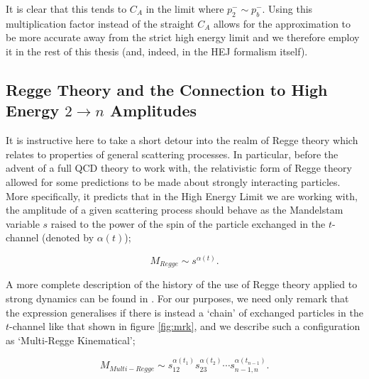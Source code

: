 It is clear that this tends to $C_A$ in the limit where $p_2^- \sim p_b^-$. Using this multiplication factor instead of the straight $C_A$ allows for the approximation to be more accurate away from the strict high energy limit and we therefore employ it in the rest of this thesis (and, indeed, in the HEJ formalism itself). 

\subsection{Regge Theory and the Connection to High Energy $2 \to n$ Amplitudes} 

It is instructive here to take a short detour into the realm of Regge theory which relates to properties of general scattering processes. In particular, before the advent of a full QCD theory to work with, the relativistic form of Regge theory allowed for some predictions to be made about strongly interacting particles. More specifically, it predicts that in the High Energy Limit we are working with, the amplitude of a given scattering process should behave as the Mandelstam variable $s$ raised to the power of the spin of the particle exchanged in the $t$-channel (denoted by $\alpha(t)$);

\begin{equation}
M_{Regge} \sim s^{\alpha(t)}.
\end{equation}

A more complete description of the history of the use of Regge theory applied to strong dynamics can be found in \cite{pomeronbook}. For our purposes, we need only remark that the expression generalises if there is instead a `chain' of exchanged particles in the $t$-channel like that shown in figure \ref{fig:mrk}, and we describe such a configuration as `Multi-Regge Kinematical'; 

\begin{equation}
M_{Multi-Regge} \sim s_{12}^{\alpha(t_1)} s_{23}^{\alpha(t_2)} \cdots s_{n-1,n}^{\alpha(t_{n-1})}.
\end{equation}

